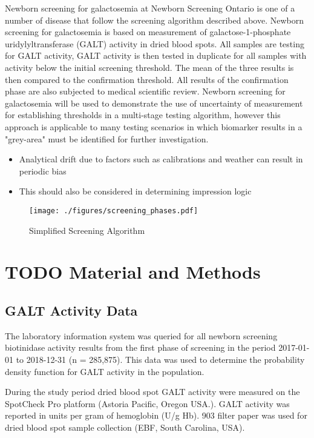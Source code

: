 \documentclass[review]{elsarticle}
\begin{document}
Newborn screening for galactosemia at Newborn Screening Ontario is one
of a number of disease that follow the screening algorithm described
above. Newborn screening for galactosemia is based on measurement of
galactose-1-phosphate uridylyltransferase (GALT) activity in dried
blood spots. All samples are testing for GALT activity, GALT activity
is then tested in duplicate for all samples with activity below the
initial screening threshold. The mean of the three results is then
compared to the confirmation threshold. All results of the
confirmation phase are also subjected to medical scientific
review. Newborn screening for galactosemia will be used to demonstrate
the use of uncertainty of measurement for establishing thresholds in a
multi-stage testing algorithm, however this approach is applicable to
many testing scenarios in which biomarker results in a "grey-area"
must be identified for further investigation.

\begin{itemize}
\item Analytical drift due to factors such as calibrations and weather can
result in periodic bias
\item This should also be considered in determining impression logic
\end{itemize}



\begin{figure}[htbp]
\centering
\texttt{[image: ./figures/screening\_phases.pdf]}
\caption{\label{fig:org2033808}Simplified Screening Algorithm}
\end{figure}


\section*{{\bfseries\sffamily TODO} Material and Methods}
\label{sec:orgca84962}
\subsection*{GALT Activity Data}
\label{sec:orgeb0fc9d}
The laboratory information system was queried for all newborn
screening biotinidase activity results from the first phase of
screening in the period 2017-01-01 to 2018-12-31 (n = 285,875). This
data was used to determine the probability density function for GALT
activity in the population.

During the study period dried blood spot GALT activity were measured
on the SpotCheck Pro platform (Astoria Pacific, Oregon USA.). GALT
activity was reported in units per gram of hemoglobin (U/g Hb). 903
filter paper was used for dried blood spot sample collection (EBF,
South Carolina, USA).
\end{document}
